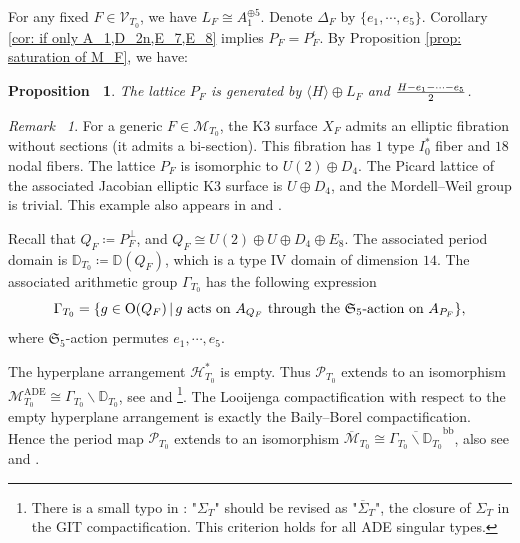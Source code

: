 \documentclass[12pt,reqno,a4paper]{amsart}
\newtheorem{prop}[thm]{Proposition~}
\theoremstyle{remark}
\newtheorem{rmk}[thm]{Remark~}
\theoremstyle{definition}
\newcommand{\DD}{\mathbb{D}}
\newcommand{\Prd}{\mathscr{P}}
\newcommand{\calH}{\mathcal{H}}
\newcommand{\calM}{\mathcal{M}}
\newcommand{\calV}{\mathcal{V}}
\newcommand\Or{\mathrm{O}}
\newcommand{\bs}{\backslash}
\newcommand{\marg}[1]{\normalsize{{\color{red}\footnote{#1}}}{\marginpar[\vskip -.3cm {\color{red}\hfill\tiny{\thefootnote}\normalsize$\implies$}]{\vskip -.3cm{ \color{red}$\impliedby$\tiny\thefootnote}}}}
\newcommand{\Zhong}[1]{\marg{\color{blue}(Zhong): #1}}
\begin{document}
For any fixed $F\in\calV_{T_0}$, we have $L_F\cong A_1^{\oplus 5}$.
Denote $\Delta_F$ by $\{ e_1,\cdots,e_5 \}$.
Corollary \ref{cor: if only A_1,D_2n,E_7,E_8} implies $P_F=P_F^{\iota}$. By Proposition \ref{prop: saturation of M_F}, we have:
\begin{prop}
    The lattice $P_F$ is generated by $\langle H\rangle\oplus L_F$ and ${H-e_1-\cdots-e_5\over2}$.
\end{prop}
\begin{rmk}
    For a generic $F\in\calM_{T_0}$, the K3 surface $X_F$ admits an elliptic fibration without sections (it admits a bi-section). This fibration has $1$ type $I_0^*$ fiber and $18$ nodal fibers. 
    The lattice $P_F$ is isomorphic to $U(2)\oplus D_4$. 
    The Picard lattice of the associated Jacobian elliptic K3 surface is $U\oplus D_4$, and the Mordell--Weil group is trivial. This example also appears in \cite[Table 1.1, No. 6]{belcastro2002picard} and \cite[Table 2]{clingher2024neron-severi}.
\end{rmk}
Recall that $Q_F\coloneqq P_F^\perp$, and $Q_F\cong U(2)\oplus U\oplus D_4\oplus E_8$.
The associated period domain is $\DD_{T_0}\coloneqq\DD(Q_F)$, which is a type IV domain of dimension $14$. 
The associated arithmetic group $\Gamma_{T_0}$ has the following expression
\begin{equation*}
    \Gamma_{T_0} = \{ g\in\Or(Q_F) \,|\, g \textup{ acts on } A_{Q_F} \textup{ through the } \mathfrak{S}_5\textup{-action on } A_{P_F}  \},
\end{equation*}
where $\mathfrak{S}_5$-action permutes $e_1,\cdots,e_5$.


The hyperplane arrangement $\calH_{T_0}^*$ is empty. Thus $\Prd_{T_0}$ extends to an isomorphism $\calM_{T_0}^{\mathrm{ADE}}\cong \Gamma_{T_0}\bs\DD_{T_0}$, see \cite[Theorem 4.1]{laza2009deformations} and \cite[Proposition 3.7]{yu2023moduli}\footnote{There is a small typo in \cite[Proposition 3.7]{yu2023moduli}: "$\Sigma_T$" should be revised as "$\overline{\Sigma}_T$", the closure of $\Sigma_T$ in the GIT compactification. This criterion holds for all ADE singular types.}.
The Looijenga compactification with respect to the empty hyperplane arrangement is exactly the Baily--Borel compactification.
Hence the period map $\Prd_{T_0}$ extends to an isomorphism $\overline{\calM}_{T_0}\cong \overline{\Gamma_{T_0}\bs\DD_{T_0}}^{\mathrm{bb}}$, also see \cite[Theorem 4.2]{laza2009deformations} and \cite[Proposition 4.3]{yu2023moduli}.
\end{document}
